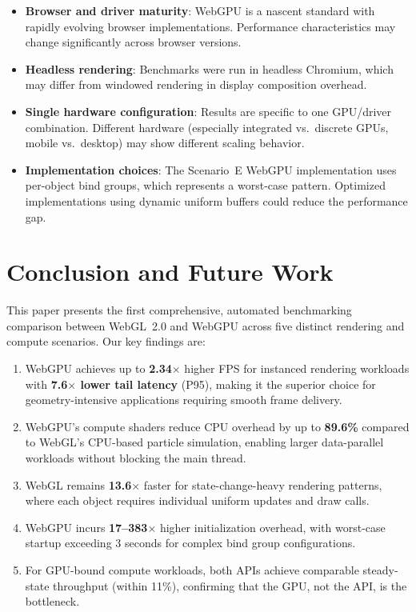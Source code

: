 \documentclass[conference]{IEEEtran}
\begin{document}
\begin{itemize}
    \item \textbf{Browser and driver maturity}: WebGPU is a nascent standard with rapidly evolving browser implementations. Performance characteristics may change significantly across browser versions.
    \item \textbf{Headless rendering}: Benchmarks were run in headless Chromium, which may differ from windowed rendering in display composition overhead.
    \item \textbf{Single hardware configuration}: Results are specific to one GPU/driver combination. Different hardware (especially integrated vs.\ discrete GPUs, mobile vs.\ desktop) may show different scaling behavior.
    \item \textbf{Implementation choices}: The Scenario~E WebGPU implementation uses per-object bind groups, which represents a worst-case pattern. Optimized implementations using dynamic uniform buffers could reduce the performance gap.
\end{itemize}

\section{Conclusion and Future Work}
\label{sec:conclusion}

This paper presents the first comprehensive, automated benchmarking comparison between WebGL~2.0 and WebGPU across five distinct rendering and compute scenarios. Our key findings are:

\begin{enumerate}
    \item WebGPU achieves up to \textbf{2.34$\times$} higher FPS for instanced rendering workloads with \textbf{7.6$\times$ lower tail latency} (P95), making it the superior choice for geometry-intensive applications requiring smooth frame delivery.
    \item WebGPU's compute shaders reduce CPU overhead by up to \textbf{89.6\%} compared to WebGL's CPU-based particle simulation, enabling larger data-parallel workloads without blocking the main thread.
    \item WebGL remains \textbf{13.6$\times$} faster for state-change-heavy rendering patterns, where each object requires individual uniform updates and draw calls.
    \item WebGPU incurs \textbf{17--383$\times$} higher initialization overhead, with worst-case startup exceeding 3 seconds for complex bind group configurations.
    \item For GPU-bound compute workloads, both APIs achieve comparable steady-state throughput (within 11\%), confirming that the GPU, not the API, is the bottleneck.
\end{enumerate}
\end{document}
